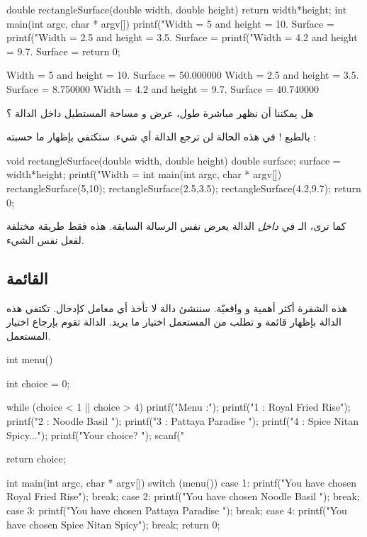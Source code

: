 \begin{Csource}
double rectangleSurface(double width, double height)
{
	return width*height;
}
int main(int argc, char * argv[])
{
	printf("Width = 5 and height = 10. Surface = %
	printf("Width = 2.5 and height = 3.5. Surface = %
	printf("Width = 4.2 and height = 9.7. Surface = %
	return 0;
}
\end{Csource}

\begin{Console}
Width = 5 and height = 10. Surface = 50.000000
Width = 2.5 and height = 3.5. Surface = 8.750000
Width = 4.2 and height = 9.7. Surface = 40.740000
\end{Console}

\begin{question}
هل يمكننا أن نظهر مباشرة طول، عرض و مساحة المستطيل داخل الدالة ؟
\end{question}

بالطبع ! في هذه الحالة لن ترجع الدالة أي شيء. ستكتفي بإظهار ما حسبته :

\begin{Csource}
void rectangleSurface(double width, double height)
{
	double surface;
	surface = width*height;
	printf("Width = %
}
int main(int argc, char * argv[])
{
	rectangleSurface(5,10);
	rectangleSurface(2.5,3.5);
	rectangleSurface(4.2,9.7);
	return 0;
}
\end{Csource}

كما ترى، الـ
في
\textit{داخل}
الدالة
يعرض نفس الرسالة السابقة. هذه فقط طريقة مختلفة لفعل نفس الشيء.

\subsection{القائمة}

هذه الشفرة أكثر أهمية و واقعيّة. سننشئ دالة 
لا تأخذ أي معامل كإدخال. تكتفي هذه الدالة بإظهار قائمة و تطلب من المستعمل اختيار ما يريد. الدالة تقوم بإرجاع اختيار المستعمل.

\begin{Csource}
int menu()
{
	int choice = 0;
	
	while (choice < 1 || choice > 4)
	{
		printf("Menu :\n");
		printf("1 : Royal Fried Rise\n");
		printf("2 : Noodle Basil \n");
		printf("3 : Pattaya Paradise \n");
		printf("4 : Spice Nitan Spicy...\n");
		printf("Your choice? ");
		scanf("%
	}   
	
	return choice;
}
int main(int argc, char * argv[])
{   
	switch (menu())
	{
		case 1:
		printf("You have chosen Royal Fried Rise\n");
		break;
		case 2:
		printf("You have chosen Noodle Basil \n");
		break;
		case 3:
		printf("You have chosen Pattaya Paradise \n");
		break;
		case 4:
		printf("You have chosen Spice Nitan Spicy\n");
		break;   
	}
	return 0;
}
\end{Csource}

